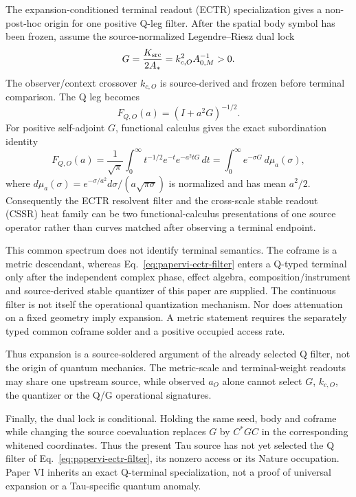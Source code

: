 \documentclass[11pt]{article}
\begin{document}
The expansion-conditioned terminal readout (ECTR) specialization gives a non-post-hoc origin for one positive Q-leg
filter.  After the spatial body symbol has been frozen, assume the
source-normalized Legendre--Riesz dual lock
\begin{equation}
 G=\frac{K_{\rm src}}{2A_*}=k_{c,O}^2A_{0,M}^{-1}>0.
 \label{eq:papervi-ectr-lock}
\end{equation}
The observer/context crossover $k_{c,O}$ is source-derived and frozen before
terminal comparison.  The Q leg becomes
\begin{equation}
 \boxed{F_{Q,O}(a)=(I+a^2G)^{-1/2}.}
 \label{eq:papervi-ectr-filter}
\end{equation}
For positive self-adjoint $G$, functional calculus gives the exact
subordination identity
\begin{equation}
 F_{Q,O}(a)=\frac{1}{\sqrt\pi}\int_0^\infty
 t^{-1/2}e^{-t}e^{-a^2tG}\,dt
 =\int_0^\infty e^{-\sigma G}\,d\mu_a(\sigma),
 \label{eq:papervi-ectr-subordination}
\end{equation}
where $d\mu_a(\sigma)=e^{-\sigma/a^2}
d\sigma/(a\sqrt{\pi\sigma})$ is normalized and has mean $a^2/2$.
Consequently the ECTR resolvent filter and the cross-scale stable readout (CSSR) heat family can be two
functional-calculus presentations of one source operator rather than curves
matched after observing a terminal endpoint.

This common spectrum does not identify terminal semantics.  The coframe is a
metric descendant, whereas Eq.~\eqref{eq:papervi-ectr-filter} enters a Q-typed
terminal only after the independent complex phase, effect algebra,
composition/instrument and source-derived stable quantizer of this paper are
supplied.  The continuous filter is not itself the operational quantization
mechanism.  Nor does attenuation on a fixed geometry imply expansion.  A
metric statement requires the separately typed common coframe solder and a
positive occupied access rate.

Thus expansion is a source-soldered argument of the already selected Q filter,
not the origin of quantum mechanics. The metric-scale and terminal-weight
readouts may share one upstream source, while observed $a_O$ alone cannot
select $G$, $k_{c,O}$, the quantizer or the Q/G operational signatures.

Finally, the dual lock is conditional.  Holding the same seed, body and
coframe while changing the source coevaluation replaces $G$ by
$C^*GC$ in the corresponding whitened coordinates.  Thus the present Tau
source has not yet selected the Q filter of
Eq.~\eqref{eq:papervi-ectr-filter}, its nonzero access or its Nature
occupation.  Paper VI inherits an exact Q-terminal specialization, not a
proof of universal expansion or a Tau-specific quantum anomaly.
\end{document}
